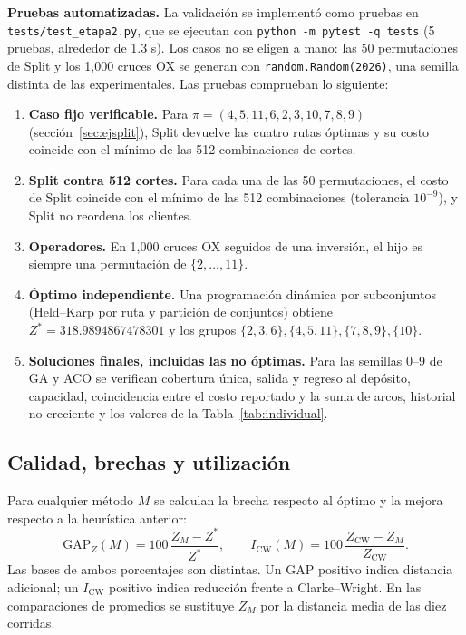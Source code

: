 \documentclass[11pt,a4paper]{article}
\numberwithin{equation}{section}
\begin{document}
\textbf{Pruebas automatizadas.} La validación se implementó como pruebas en \texttt{tests/test\_etapa2.py}, que se ejecutan con \texttt{python -m pytest -q tests} (5 pruebas, alrededor de 1.3 s). Los casos no se eligen a mano: las 50 permutaciones de Split y los 1,000 cruces OX se generan con \texttt{random.Random(2026)}, una semilla distinta de las experimentales. Las pruebas comprueban lo siguiente:
\begin{enumerate}
\item \textbf{Caso fijo verificable.} Para \(\pi=(4,5,11,6,2,3,10,7,8,9)\) (sección~\ref{sec:ejsplit}), Split devuelve las cuatro rutas óptimas y su costo coincide con el mínimo de las 512 combinaciones de cortes.
\item \textbf{Split contra 512 cortes.} Para cada una de las 50 permutaciones, el costo de Split coincide con el mínimo de las 512 combinaciones (tolerancia \(10^{-9}\)), y Split no reordena los clientes.
\item \textbf{Operadores.} En 1,000 cruces OX seguidos de una inversión, el hijo es siempre una permutación de \(\{2,\dots,11\}\).
\item \textbf{Óptimo independiente.} Una programación dinámica por subconjuntos (Held--Karp por ruta y partición de conjuntos) obtiene \(Z^*=318.9894867478301\) y los grupos \(\{2,3,6\},\{4,5,11\},\{7,8,9\},\{10\}\).
\item \textbf{Soluciones finales, incluidas las no óptimas.} Para las semillas 0--9 de GA y ACO se verifican cobertura única, salida y regreso al depósito, capacidad, coincidencia entre el costo reportado y la suma de arcos, historial no creciente y los valores de la Tabla~\ref{tab:individual}.
\end{enumerate}

\subsection{Calidad, brechas y utilización}

Para cualquier método \(M\) se calculan la brecha respecto al óptimo y la mejora respecto a la heurística anterior:
\begin{equation}\label{eq:gap}
\mathrm{GAP}_Z(M)=100\,\frac{Z_M-Z^*}{Z^*},\qquad I_{\mathrm{CW}}(M)=100\,\frac{Z_{\mathrm{CW}}-Z_M}{Z_{\mathrm{CW}}}.
\end{equation}
Las bases de ambos porcentajes son distintas. Un GAP positivo indica distancia adicional; un \(I_{\mathrm{CW}}\) positivo indica reducción frente a Clarke--Wright. En las comparaciones de promedios se sustituye \(Z_M\) por la distancia media de las diez corridas.
\end{document}
